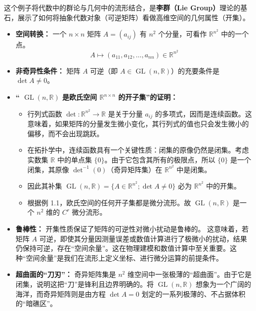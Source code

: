 \begin{myremark}

这个例子将代数中的群论与几何中的流形结合，是\textbf{李群（Lie Group）}理论的基石，展示了如何将抽象代数对象（可逆矩阵）看做高维空间的几何属性（开集）。

\begin{itemize}
    \item \textbf{空间转换：} 一个 $n \times n$ 矩阵 $A = (a_{ij})$ 有 $n^2$ 个分量，可看作 $\mathbb{R}^{n^2}$ 中的一个点。
    $$ A \mapsto (a_{11}, a_{12}, \dots, a_{nn}) \in \mathbb{R}^{n^2} \text{} $$
    \item \textbf{非奇异性条件：} 矩阵 $A$ 可逆（即 $A \in \operatorname{GL}(n, \mathbb{R})$）的充要条件是 $\det A \neq 0$。
    \item \textbf{“ $\operatorname{GL}(n, \mathbb{R})$  是欧氏空间  $\mathbb{R}^{n\times n}$  的开子集”的证明：} 
    \begin{itemize}
        \item 行列式函数 $\det: \mathbb{R}^{n^2} \to \mathbb{R}$ 是关于分量 $a_{ij}$ 的多项式，因而是连续函数。这意味着，如果矩阵的分量发生微小变化，其行列式的值也只会发生微小的偏移，而不会出现跳跃。
        \item 在拓扑学中，连续函数具有一个关键性质：闭集的原像仍然是闭集。考虑实数集 $\mathbb{R}$ 中的单点集 $\{0\}$。由于它包含其所有的极限点，所以 $\{0\}$ 是一个闭集，其原像 $\det^{-1}(0)$（奇异矩阵集）在 $\mathbb{R}^{n^2}$ 中是闭集。
        \item 因此其补集 $\operatorname{GL}(n, \mathbb{R}) = \{A \in \mathbb{R}^{n^2}; \det A \neq 0\}$ 必为 $\mathbb{R}^{n^2}$ 中的开集。
        \item 根据例 1.1，欧氏空间的任何开子集都是微分流形。故 $\operatorname{GL}(n, \mathbb{R})$ 是一个 $n^2$ 维的 $C^r$ 微分流形。
    \end{itemize}
\end{itemize}

\begin{itemize}
\item \textbf{鲁棒性：} 开集性质保证了矩阵的可逆性对微小扰动是鲁棒的。 这意味着，若矩阵 $A$ 可逆，即使其分量因测量误差或数值计算进行了极微小的扰动，结果仍保持可逆，存在“空间余量”。这在物理建模和数值计算中至关重要。这种“空间余量”是我们在流形上定义坐标、进行微分运算的前提条件。
\item \textbf{超曲面的“刀刃”：} 奇异矩阵集是 $n^2$ 维空间中一张极薄的“超曲面”。由于它是闭集，说明这把“刀”是锋利且边界明确的。将 $\operatorname{GL}(n, \mathbb{R})$ 想象为一个广阔的海洋，而奇异矩阵则是由方程 $\det A = 0$ 划定的一系列极薄的、不占据体积的“暗礁区”。


\end{itemize}
\end{myremark}
